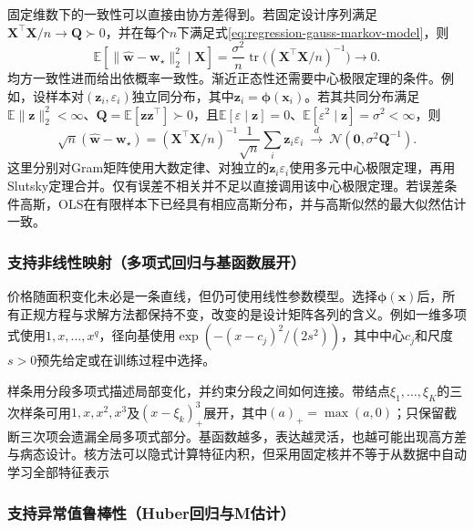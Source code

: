 固定维数下的一致性可以直接由协方差得到。若固定设计序列满足$\bm{X}^{\top}\bm{X}/n\to\bm{Q}\succ0$，并在每个$n$下满足式\eqref{eq:regression-gauss-markov-model}，则
\[
  \mathbb{E}[\lVert\widehat{\bm{w}}-\bm{w}_{\star}\rVert_2^2\mid\bm{X}]
  =\frac{\sigma^2}{n}\operatorname{tr}
       \bigl((\bm{X}^{\top}\bm{X}/n)^{-1}\bigr)\longrightarrow0.
\]
均方一致性进而给出依概率一致性。渐近正态性还需要中心极限定理的条件。例如，设样本对$(\bm{z}_i,\varepsilon_i)$独立同分布，其中$\bm{z}_i=\bm{\phi}(\bm{x}_i)$。若其共同分布满足$\mathbb{E}\lVert\bm{z}\rVert_2^2<\infty$、$\bm{Q}=\mathbb{E}[\bm{z}\bm{z}^{\top}]\succ0$，且$\mathbb{E}[\varepsilon\mid\bm{z}]=0$、$\mathbb{E}[\varepsilon^2\mid\bm{z}]=\sigma^2<\infty$，则
\[
  \sqrt n(\widehat{\bm{w}}-\bm{w}_{\star})
  =
  (\bm{X}^{\top}\bm{X}/n)^{-1}
  \frac{1}{\sqrt n}\sum_i\bm{z}_i\varepsilon_i
  \ \xrightarrow{d}\ \mathcal{N}(\bm{0},\sigma^2\bm{Q}^{-1}).
\]
这里分别对Gram矩阵使用大数定律、对独立的$\bm{z}_i\varepsilon_i$使用多元中心极限定理，再用Slutsky定理合并。仅有误差不相关并不足以直接调用该中心极限定理。若误差条件高斯，OLS在有限样本下已经具有相应高斯分布，并与高斯似然的最大似然估计一致。

\subsubsection{支持非线性映射（多项式回归与基函数展开）}
\label{sec:regression-basis}

价格随面积变化未必是一条直线，但仍可使用线性参数模型。选择$\bm{\phi}(\bm{x})$后，所有正规方程与求解方法都保持不变，改变的是设计矩阵各列的含义。例如一维多项式使用$1,x,\ldots,x^q$，径向基使用$\exp(-(x-c_j)^2/(2s^2))$，其中中心$c_j$和尺度$s>0$预先给定或在训练过程中选择。

样条用分段多项式描述局部变化，并约束分段之间如何连接。带结点$\xi_1,\ldots,\xi_K$的三次样条可用$1,x,x^2,x^3$及$(x-\xi_k)_+^3$展开，其中$(a)_+=\max(a,0)$；只保留截断三次项会遗漏全局多项式部分。基函数越多，表达越灵活，也越可能出现高方差与病态设计。核方法可以隐式计算特征内积，但采用固定核并不等于从数据中自动学习全部特征表示

\subsubsection{支持异常值鲁棒性（Huber回归与M估计）}
\label{sec:regression-huber}

